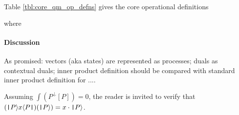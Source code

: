 Table \ref{tbl:core_qm_op_defns} gives the core operational definitions

\begin{table}[htp]\label{tbl:core_qm_op_defns}
  \caption{QM - operational definitions}
\end{table}

where


\paragraph{Discussion}
As promised: vectors (aka states) are represented as processes; duals
as contextual duals; inner product definition should be compared with
standard inner product definition for ....

\begin{remark}
  Assuming $\int (P^{\underline{\perp}}[P]) = 0$, the reader is
  invited to verify that $(\mathbin{\texttt{|}} P \rangle x \langle P \mathbin{\texttt{|}})(\mathbin{\texttt{|}} P \rangle) = x \cdot \mathbin{\texttt{|}} P \rangle$.
\end{remark}

